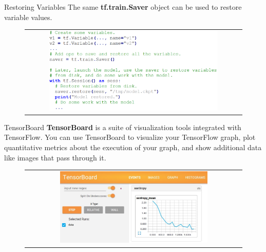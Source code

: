 \documentclass[aspectratio=169]{beamer}
\begin{document}

\begin{frame}{Restoring Variables}
The same \textbf{tf.train.Saver} object can be used to restore variable values.
\begin{figure}
\begin{tabular}{c}
\includegraphics[width=0.8\textwidth]{img/tf/restore_variables.png}
\end{tabular}
\end{figure}
\end{frame}


\begin{frame}{TensorBoard}
\textbf{TensorBoard} is a suite of visualization tools integrated with TensorFlow. You can use TensorBoard to visualize your TensorFlow graph, plot quantitative metrics about the execution of your graph, and show additional data like images that pass through it.
\begin{figure}
\begin{tabular}{c}
\includegraphics[width=0.7\textwidth]{img/tf/tensorboard.jpg}
\end{tabular}
\end{figure}
\end{frame}

\end{document}
